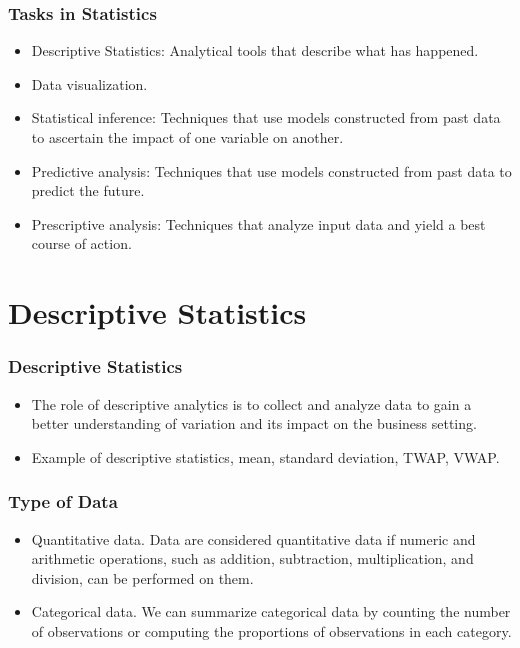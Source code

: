 \documentclass[11pt]{beamer}
\begin{document}
\begin{frame}
\frametitle{Tasks in Statistics}
    \begin{itemize}
        \item Descriptive Statistics: Analytical tools that describe what has happened.
        \item Data visualization.
        \item Statistical inference: Techniques that use models constructed from past data to ascertain the impact of one variable on another.
        \item Predictive analysis: Techniques that use models constructed from past data to predict the future.
        \item Prescriptive analysis: Techniques that analyze input data and yield a best course of action.
    \end{itemize}

\end{frame}

\section{Descriptive Statistics}

\begin{frame}
\frametitle{Descriptive Statistics}
\begin{itemize}
    \item The role of descriptive analytics is to collect and analyze data to gain a better understanding of variation and its impact on the business setting.
    \item Example of descriptive statistics, mean, standard deviation, TWAP, VWAP.
\end{itemize}
\end{frame}

\begin{frame}
\frametitle{Type of Data}
\begin{itemize}
    \item Quantitative data. Data are considered quantitative data if numeric and arithmetic operations, such as addition, subtraction, multiplication, and division, can be performed on them.
    \item Categorical data. We can summarize categorical data by counting the number of observations or computing the proportions of observations in each category.
\end{itemize}
\end{frame}
\end{document}
